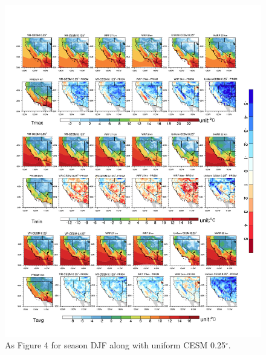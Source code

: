 \begin{figure}
\begin{center}
\includegraphics[width=6in]{supplement/t2_DJF.pdf}
\caption{As Figure 4 for season DJF along with uniform CESM 0.25$^\circ$.}
\end{center}
\end{figure}
%
